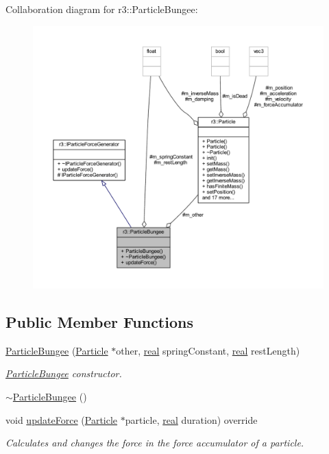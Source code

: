 Collaboration diagram for r3\+:\+:Particle\+Bungee\+:\nopagebreak
\begin{figure}[H]
\begin{center}
\leavevmode
\includegraphics[width=350pt]{classr3_1_1_particle_bungee__coll__graph}
\end{center}
\end{figure}
\subsection*{Public Member Functions}
\begin{DoxyCompactItemize}
\item 
\mbox{\hyperlink{classr3_1_1_particle_bungee_aab8cdf8541433de21bc3d31db0434b6e}{Particle\+Bungee}} (\mbox{\hyperlink{classr3_1_1_particle}{Particle}} $\ast$other, \mbox{\hyperlink{namespacer3_ab2016b3e3f743fb735afce242f0dc1eb}{real}} spring\+Constant, \mbox{\hyperlink{namespacer3_ab2016b3e3f743fb735afce242f0dc1eb}{real}} rest\+Length)
\begin{DoxyCompactList}\small\item\em \mbox{\hyperlink{classr3_1_1_particle_bungee}{Particle\+Bungee}} constructor. \end{DoxyCompactList}\item 
\mbox{\hyperlink{classr3_1_1_particle_bungee_a54b12a4381fdcaeaba38a743c96b2bdc}{$\sim$\+Particle\+Bungee}} ()
\item 
void \mbox{\hyperlink{classr3_1_1_particle_bungee_a04de21f7e418f572a9c9dfc936384b96}{update\+Force}} (\mbox{\hyperlink{classr3_1_1_particle}{Particle}} $\ast$particle, \mbox{\hyperlink{namespacer3_ab2016b3e3f743fb735afce242f0dc1eb}{real}} duration) override
\begin{DoxyCompactList}\small\item\em Calculates and changes the force in the force accumulator of a particle. \end{DoxyCompactList}\end{DoxyCompactItemize}
